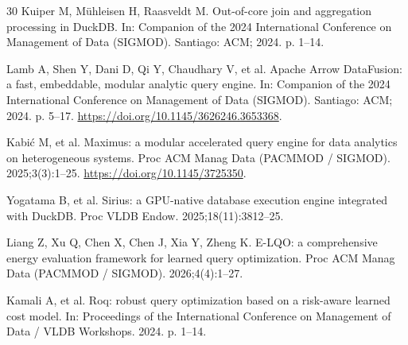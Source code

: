 \documentclass[10pt,a4paper]{article}
\begin{document}
\begin{thebibliography}{30}
Kuiper M, M{\"u}hleisen H, Raasveldt M. Out-of-core join and aggregation processing in DuckDB. In: Companion of the 2024 International Conference on Management of Data (SIGMOD). Santiago: ACM; 2024. p. 1--14.

Lamb A, Shen Y, Dani D, Qi Y, Chaudhary V, et al. Apache Arrow DataFusion: a fast, embeddable, modular analytic query engine. In: Companion of the 2024 International Conference on Management of Data (SIGMOD). Santiago: ACM; 2024. p. 5--17. \url{https://doi.org/10.1145/3626246.3653368}.


 Kabi\'{c} M, et al. Maximus: a modular accelerated query engine for data analytics on heterogeneous systems. Proc ACM Manag Data (PACMMOD / SIGMOD). 2025;3(3):1--25. \url{https://doi.org/10.1145/3725350}.

 Yogatama B, et al. Sirius: a GPU-native database execution engine integrated with DuckDB. Proc VLDB Endow. 2025;18(11):3812--25.

 Liang Z, Xu Q, Chen X, Chen J, Xia Y, Zheng K. E-LQO: a comprehensive energy evaluation framework for learned query optimization. Proc ACM Manag Data (PACMMOD / SIGMOD). 2026;4(4):1--27.

 Kamali A, et al. Roq: robust query optimization based on a risk-aware learned cost model. In: Proceedings of the International Conference on Management of Data / VLDB Workshops. 2024. p. 1--14.

\end{thebibliography}
\end{document}
